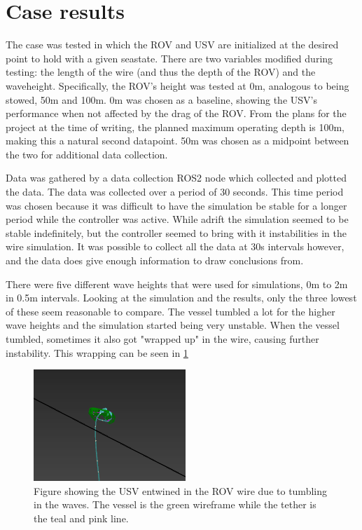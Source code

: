 \documentclass[class=article, crop=false]{standalone}
\begin{document}
\section{Case results}
\label{sec:case}
The case was tested in which the ROV and USV are initialized at the desired point to hold with a given seastate. There are two variables modified during testing: the length of the wire (and thus the depth of the ROV) and the waveheight. Specifically, the ROV's height was tested at 0m, analogous to being stowed, 50m and 100m. 0m was chosen as a baseline, showing the USV's performance when not affected by the drag of the ROV. From the plans for the project at the time of writing, the planned maximum operating depth is 100m, making this a natural second datapoint. 50m was chosen as a midpoint between the two for additional data collection.

Data was gathered by a data collection ROS2 node which collected and plotted the data. The data was collected over a period of 30 seconds. This time period was chosen because it was difficult to have the simulation be stable for a longer period while the controller was active. While adrift the simulation seemed to be stable indefinitely, but the controller seemed to bring with it instabilities in the wire simulation. It was possible to collect all the data at 30s intervals however, and the data does give enough information to draw conclusions from.

There were five different wave heights that were used for simulations, 0m to 2m in 0.5m intervals. Looking at the simulation and the results, only the three lowest of these seem reasonable to compare. The vessel tumbled a lot for the higher wave heights and the simulation started being very unstable. When the vessel tumbled, sometimes it also got "wrapped up" in the wire, causing further instability. This wrapping can be seen in \cref{fig:entwined}

\begin{figure}[h]
    \centering
    \includegraphics{entwined}
    \caption{Figure showing the USV entwined in the ROV wire due to tumbling in the waves. The vessel is the green wireframe while the tether is the teal and pink line.}
    \label{fig:entwined}
\end{figure}
\end{document}
